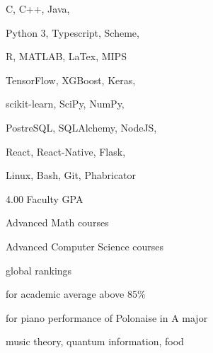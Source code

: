 C, C++, Java,
\smallskip

Python 3, Typescript, Scheme,
\smallskip

R, MATLAB, LaTex, MIPS

\divider\smallskip

TensorFlow, XGBoost, Keras,
\smallskip

scikit-learn, SciPy, NumPy,
\smallskip

PostreSQL, SQLAlchemy, NodeJS,
\smallskip

React, React-Native, Flask,

\divider\smallskip

Linux, Bash, Git, Phabricator



4.00 Faculty GPA

Advanced Math courses

Advanced Computer Science courses


global rankings

\divider\smallskip

for academic average above 85\%

\divider\smallskip

for piano performance of Polonaise in A major

\divider\smallskip


music theory, quantum information, food

